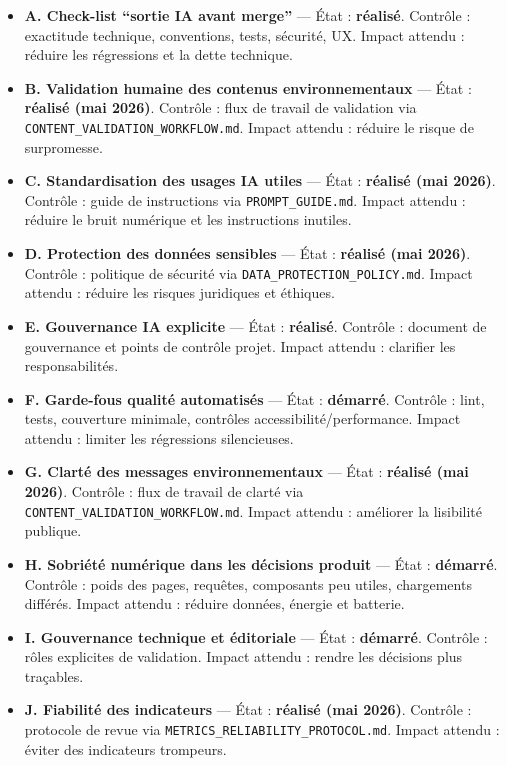 \documentclass[
  10pt,
  a4paper,
  DIV=11,
  numbers=noendperiod,
  oneside]{scrreprt}
\providecommand{\tightlist}{%
  \setlength{\itemsep}{0pt}\setlength{\parskip}{0pt}}
\let\oldtextbf\textbf
\renewcommand{\textbf}[1]{\oldtextbf{\textcolor{cmmnavy}{#1}}}
\begin{document}
\begin{itemize}
\tightlist
\item
  \textbf{A. Check-list ``sortie IA avant merge''} --- État :
  \textbf{réalisé}. Contrôle : exactitude technique, conventions, tests,
  sécurité, UX. Impact attendu : réduire les régressions et la dette
  technique.
\item
  \textbf{B. Validation humaine des contenus environnementaux} --- État
  : \textbf{réalisé (mai 2026)}. Contrôle : flux de travail de
  validation via \texttt{CONTENT\_VALIDATION\_WORKFLOW.md}. Impact
  attendu : réduire le risque de surpromesse.
\item
  \textbf{C. Standardisation des usages IA utiles} --- État :
  \textbf{réalisé (mai 2026)}. Contrôle : guide de instructions via
  \texttt{PROMPT\_GUIDE.md}. Impact attendu : réduire le bruit numérique
  et les instructions inutiles.
\item
  \textbf{D. Protection des données sensibles} --- État :
  \textbf{réalisé (mai 2026)}. Contrôle : politique de sécurité via
  \texttt{DATA\_PROTECTION\_POLICY.md}. Impact attendu : réduire les
  risques juridiques et éthiques.
\item
  \textbf{E. Gouvernance IA explicite} --- État : \textbf{réalisé}.
  Contrôle : document de gouvernance et points de contrôle projet.
  Impact attendu : clarifier les responsabilités.
\item
  \textbf{F. Garde-fous qualité automatisés} --- État :
  \textbf{démarré}. Contrôle : lint, tests, couverture minimale,
  contrôles accessibilité/performance. Impact attendu : limiter les
  régressions silencieuses.
\item
  \textbf{G. Clarté des messages environnementaux} --- État :
  \textbf{réalisé (mai 2026)}. Contrôle : flux de travail de clarté via
  \texttt{CONTENT\_VALIDATION\_WORKFLOW.md}. Impact attendu : améliorer
  la lisibilité publique.
\item
  \textbf{H. Sobriété numérique dans les décisions produit} --- État :
  \textbf{démarré}. Contrôle : poids des pages, requêtes, composants peu
  utiles, chargements différés. Impact attendu : réduire données,
  énergie et batterie.
\item
  \textbf{I. Gouvernance technique et éditoriale} --- État :
  \textbf{démarré}. Contrôle : rôles explicites de validation. Impact
  attendu : rendre les décisions plus traçables.
\item
  \textbf{J. Fiabilité des indicateurs} --- État : \textbf{réalisé (mai
  2026)}. Contrôle : protocole de revue via
  \texttt{METRICS\_RELIABILITY\_PROTOCOL.md}. Impact attendu : éviter
  des indicateurs trompeurs.
\end{itemize}
\end{document}
